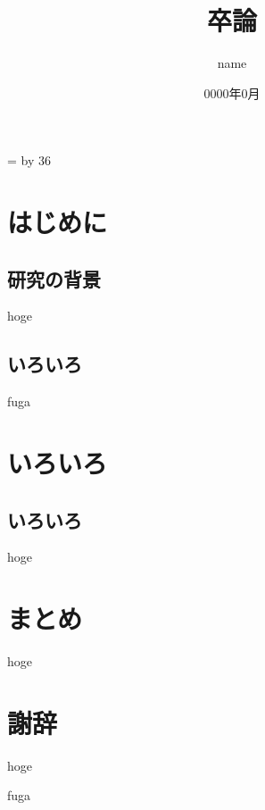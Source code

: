 \documentclass[10pt,a4paper]{jsarticle}
\title{卒論} %
\date{0000年0月} %
\author{name} %
\def\linesparpage#1{
    \baselineskip=\textheight
    \divide\baselineskip by #1
}
\begin{document}
\linesparpage{36} %

\begin{titlepage}
\maketitle
\thispagestyle{empty}
\end{titlepage}

\tableofcontents
\thispagestyle{empty}
\newpage

\setcounter{page}{1}
\pagestyle{plain}

\section{はじめに}

\subsection{研究の背景}
hoge\cite{hoge}

\subsection{いろいろ}
fuga

\section{いろいろ}

\subsection{いろいろ}
hoge

\section{まとめ}
hoge

\section*{謝辞} %
hoge

\begin{flushleft} %
\begin{thebibliography}{9} %

fuga %

\end{thebibliography}
\end{flushleft}
\end{document}
